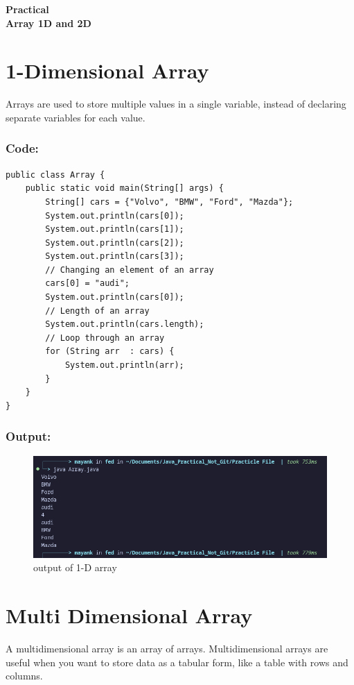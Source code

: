 \documentclass[a4paper,12pt]{article}
\newcounter{practicalno} %
\newcommand{\practicaltitle}[1]{
    \stepcounter{practicalno} %
    \newpage
    \begin{center}
        \vspace{1cm}
        \Large\textbf{Practical \thepracticalno} \\
        \vspace{0.5cm}
        \Large\textbf{#1} %
        \normalsize\vspace{1cm}
    \end{center}
}
\begin{document}
\practicaltitle{Array 1D and 2D}

\section{1-Dimensional Array}
Arrays are used to store multiple values in a single variable, instead of declaring separate variables for each value.
\subsubsection{Code: }
\begin{lstlisting}
public class Array {
    public static void main(String[] args) {
        String[] cars = {"Volvo", "BMW", "Ford", "Mazda"};
        System.out.println(cars[0]); 
        System.out.println(cars[1]); 
        System.out.println(cars[2]); 
        System.out.println(cars[3]); 
        // Changing an element of an array
        cars[0] = "audi";
        System.out.println(cars[0]); 
        // Length of an array
        System.out.println(cars.length);
        // Loop through an array
        for (String arr  : cars) {
            System.out.println(arr);
        }
    }
}  
\end{lstlisting}
\subsubsection{Output: }
\begin{figure}[H]
    \centering
    \includegraphics[width=0.9\linewidth]{images/output2.png}
    \caption{output of 1-D array}
    \label{fig:sample_image}
\end{figure}

\section{Multi Dimensional Array}
A multidimensional array is an array of arrays. Multidimensional arrays are useful when you want to store data as a tabular form, like a table with rows and columns.
\end{document}
